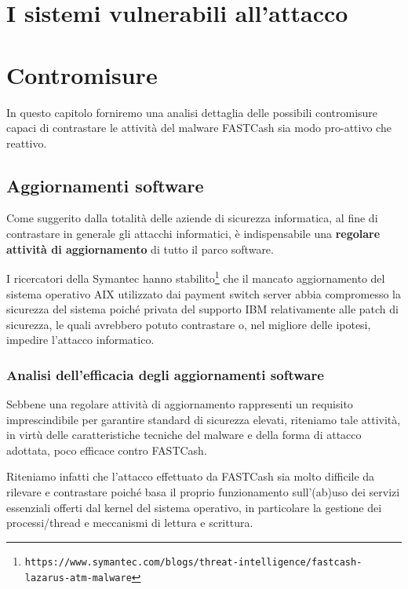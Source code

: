 \documentclass[10pt,a4paper, titlepage]{report}
\begin{document}
\newpage
\chapter{I sistemi vulnerabili all'attacco}

\newpage
\chapter{Contromisure}

In questo capitolo forniremo una analisi dettaglia delle possibili contromisure capaci di contrastare le attività del malware FASTCash sia modo pro-attivo che reattivo.

\section{Aggiornamenti software}

Come suggerito dalla totalità delle aziende di sicurezza informatica, al fine di contrastare in generale gli attacchi informatici, è indispensabile una \textbf{regolare attività di aggiornamento} di tutto il parco software.

I ricercatori della Symantec hanno stabilito\footnote{\texttt{https://www.symantec.com/blogs/threat-intelligence/fastcash-lazarus-atm-malware}} che il mancato aggiornamento del sistema operativo AIX utilizzato dai payment switch server abbia compromesso la sicurezza del sistema poiché privata del supporto IBM relativamente alle patch di sicurezza, le quali avrebbero potuto contrastare o, nel migliore delle ipotesi, impedire l'attacco informatico. 

\subsection{Analisi dell'efficacia degli aggiornamenti software}

Sebbene una regolare attività di aggiornamento rappresenti un requisito imprescindibile per garantire standard di sicurezza elevati, riteniamo tale attività, in virtù delle caratteristiche tecniche del malware e della forma di attacco adottata, poco efficace contro FASTCash.
 
Riteniamo infatti che l'attacco effettuato da FASTCash sia molto difficile da rilevare e contrastare poiché basa il proprio funzionamento sull'(ab)uso dei servizi essenziali offerti dal kernel del sistema operativo, in particolare la gestione dei processi/thread e meccanismi di lettura e scrittura. 
\end{document}
